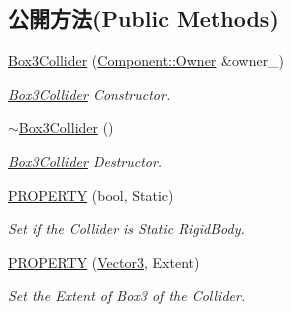 \subsection*{公開方法(Public Methods)}
\begin{DoxyCompactItemize}
\item 
\hyperlink{class_magnum_1_1_box3_collider_ae3d4cfe7fe036b9ca1d1ae0acc000cbf}{Box3\+Collider} (\hyperlink{class_magnum_1_1_component_1_1_owner}{Component\+::\+Owner} \&owner\+\_\+)
\begin{DoxyCompactList}\small\item\em \hyperlink{class_magnum_1_1_box3_collider}{Box3\+Collider} Constructor. \end{DoxyCompactList}\item 
\hyperlink{class_magnum_1_1_box3_collider_ad9a35676b5bd29f476064cadef3f648c}{$\sim$\+Box3\+Collider} ()
\begin{DoxyCompactList}\small\item\em \hyperlink{class_magnum_1_1_box3_collider}{Box3\+Collider} Destructor. \end{DoxyCompactList}\item 
\hyperlink{class_magnum_1_1_box3_collider_a97f259871b4f1266211226be5daee798}{P\+R\+O\+P\+E\+R\+TY} (bool, Static)
\begin{DoxyCompactList}\small\item\em Set if the Collider is Static Rigid\+Body. \end{DoxyCompactList}\item 
\hyperlink{class_magnum_1_1_box3_collider_abd2c91a11f7da997ebb3c41e023bb2e7}{P\+R\+O\+P\+E\+R\+TY} (\hyperlink{class_magnum_1_1_vector3}{Vector3}, Extent)
\begin{DoxyCompactList}\small\item\em Set the Extent of Box3 of the Collider. \end{DoxyCompactList}\end{DoxyCompactItemize}
